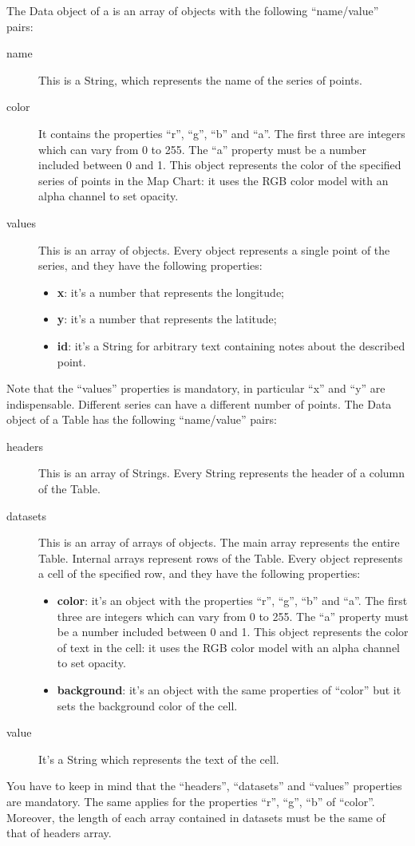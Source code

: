 			The Data object of a  is an array of objects with the following “name/value” pairs:
			\begin{description}
				\item[name] This is a String, which represents the name of the series of points.
				\item[color] It contains the properties “r”, “g”, “b” and “a”. The first three are integers which can vary from 0 to 255. The “a” property must be a number included between 0 and 1. This object represents the color of the specified series of points in the Map Chart: it uses the RGB color model with an alpha channel to set opacity.
				\item[values] This is an array of objects. Every object represents a single point of the series, and they have the following properties:
					\begin{itemize}
						\item \textbf{x}: it's a number that represents the longitude;
						\item \textbf{y}: it's a number that represents the latitude;
						\item \textbf{id}: it's a String for arbitrary text containing notes about the described point.
					\end{itemize}
			\end{description}
			Note that the “values” properties is mandatory, in particular “x” and “y” are indispensable. Different series can have a different number of points.
			The Data object of a Table has the following “name/value” pairs:
			\begin{description}
				\item[headers] This is an array of Strings. Every String represents the header of a column of the Table.
				\item[datasets] This is an array of arrays of objects. The main array represents the entire Table. Internal arrays represent rows of the Table. Every object represents a cell of the specified row, and they have the following properties:
				\begin{itemize}
					\item \textbf{color}: it's an object with the properties “r”, “g”, “b” and “a”. The first three are integers which can vary from 0 to 255. The “a” property must be a number included between 0 and 1.
					This object represents the color of text in the cell: it uses the RGB color model with an alpha channel to set opacity.
					\item \textbf{background}: it's an object with the same properties of “color” but it sets the background color of the cell.
				\end{itemize}
				\item[value] It's a String which represents the text of the cell.
			\end{description}
			You have to keep in mind that the “headers”, “datasets” and “values” properties are mandatory. The same applies for the properties “r”, “g”, “b” of “color”. Moreover, the length of each array contained in datasets must be the same of that of headers array.

